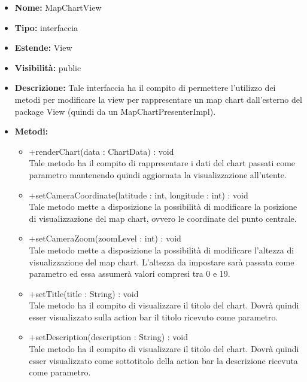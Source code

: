 			
			\begin{itemize}
			\item \textbf{Nome:} MapChartView
			\item \textbf{Tipo:} interfaccia
			
		\item \textbf{Estende:}
		View
			\item \textbf{Visibilità:} public
			\item \textbf{Descrizione:} Tale interfaccia ha il compito di permettere l'utilizzo dei metodi per modificare la view per rappresentare un map chart dall'esterno del package View (quindi da un MapChartPresenterImpl).
			\item \textbf{Metodi:}
				\begin{itemize}
				\setlength{\itemsep}{5pt}
				
					\item[\ding{111}] {{+renderChart(data : ChartData) : void}} \\ [1mm] Tale metodo ha il compito di rappresentare i dati del chart passati come parametro mantenendo quindi aggiornata la visualizzazione all'utente.
					\item[\ding{111}] {{+setCameraCoordinate(latitude : int, longitude : int) : void}} \\ [1mm] Tale metodo mette a disposizione la possibilità di modificare la posizione di visualizzazione del map chart, ovvero le coordinate del punto centrale.
					\item[\ding{111}] {{+setCameraZoom(zoomLevel : int) : void}} \\ [1mm] Tale metodo mette a disposizione la possibilità di modificare l'altezza di visualizzazione del map chart. L'altezza da impostare sarà passata come parametro ed essa assumerà valori compresi tra 0 e 19.
					\item[\ding{111}] {{+setTitle(title : String) : void}} \\ [1mm] Tale metodo ha il compito di visualizzare il titolo del chart. Dovrà quindi esser visualizzato sulla action bar il titolo ricevuto come parametro.
					\item[\ding{111}] {{+setDescription(description : String) : void}} \\ [1mm] Tale metodo ha il compito di visualizzare il titolo del chart. Dovrà quindi esser visualizzato come sottotitolo della action bar la descrizione ricevuta come parametro.
				\end{itemize}
		
			\end{itemize}

